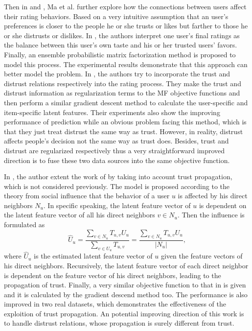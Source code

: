 Then in \cite{ma2009llearningEnsembel} and \cite{ma2009learningTrust}, Ma et al. further explore how the connections between users affect their rating behaviors. Based on a very intuitive assumption that an user's preferences is closer to the people he or she trusts or likes but farther to those he or she distrusts or dislikes. In \cite{ma2009llearningEnsembel}, the authors interpret one user's final ratings as the balance between this user's own taste and his or her trusted users' favors. Finally, an ensemble probabilistic matrix factorization method is proposed to model this process. The experimental results demonstrate that this approach can better model the problem. In \cite{ma2009learningTrust}, the authors try to incorporate the trust and distrust relations respectively into the rating process. They make the trust and distrust information as regularization terms to the MF objective functions and then perform a similar gradient descent method to calculate the user-specific and item-specific latent features. Their experiments also show the improving performance of prediction while an obvious problem facing this method, which is that they just treat distrust the same way as trust. However, in reality, distrust affects people's decision not the same way as trust does. Besides, trust and distrust are regularized respectively thus a very straightforward improved direction is to fuse these two data sources into the same objective function. 

In \cite{jamali2010matrix}, the author extent the work of \cite{ma2009llearningEnsembel} by taking into account trust propagation, which is not considered previously. The model is proposed according to the theory from social influence that the behavior of a user $u$ is affected by his direct neighbors $N_u$. In specific speaking, the latent feature vector of $u$ is dependent on the latent feature vector of all his direct neighbors $v \in N_u$. Then the influence is formulated as 
\begin{equation}
\widehat{U}_u = \frac{\sum_{v \in N_u} T_{u,v}U_u}{\sum_{v \in U_u}T_{u,v}} = \frac{\sum_{v \in N_u} T_{u,v}U_u}{|N_u|},
\end{equation}
where $\widehat{U}_u$ is the estimated latent feature vector of $u$ given the feature vectors of his direct neighbors. Recursively, the latent feature vector of each direct neighbor is dependent on the feature vector of his direct neighbors, leading to the propagation of trust. Finally, a very similar objective function to that in \cite{ma2009learningTrust} is given and it is calculated by the gradient descend method too. The performance is also improved in two real datasets, which demonstrates the effectiveness of the exploition of trust propagation. An potential improving direction of this work is to handle distrust relations, whose propagation is surely different from trust.

